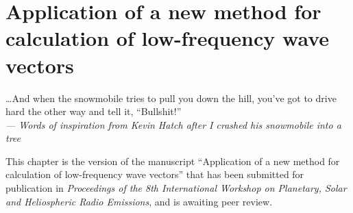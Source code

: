 
\chapter{Application of a new method for calculation of low-frequency
  wave vectors}
\label{chp:5}

\begin{flushright}
  \begin{minipage}[]{0.5\linewidth}
    \begin{flushright}
      \dots And when the snowmobile tries to pull you down the hill, you've got to drive hard the other way and tell it, ``Bullshit!''
      \\{\small \emph{--- Words of inspiration from Kevin Hatch after I crashed his snowmobile into a tree } }
    \end{flushright}
  \end{minipage}
\end{flushright}
\vspace{\baselineskip}

This chapter is the version of the manuscript ``Application of a new
method for calculation of low-frequency wave vectors'' that has been
submitted for publication in \textsl{Proceedings of the 8th
  International Workshop on Planetary, Solar and Heliospheric Radio
  Emissions}, and is awaiting peer review.

